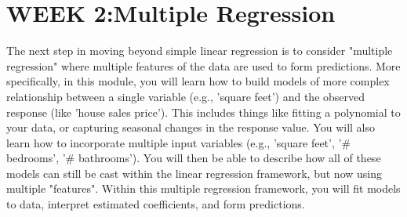 \section{WEEK 2:Multiple Regression}
The next step in moving beyond simple linear regression is to consider "multiple regression" where multiple features of the data are used to form predictions.
More specifically, in this module, you will learn how to build models of more complex relationship between a single variable (e.g., 'square feet') and the observed response (like 'house sales price'). This includes things like fitting a polynomial to your data, or capturing seasonal changes in the response value. You will also learn how to incorporate multiple input variables (e.g., 'square feet', '# bedrooms', '# bathrooms'). You will then be able to describe how all of these models can still be cast within the linear regression framework, but now using multiple "features". Within this multiple regression framework, you will fit models to data, interpret estimated coefficients, and form predictions.

